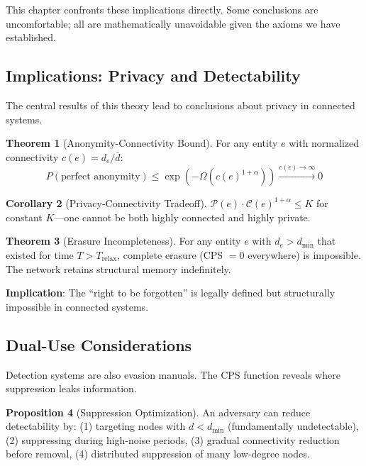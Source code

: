 \documentclass[12pt,a4paper]{article}
\theoremstyle{definition}
\newtheorem{theorem}{Theorem}[section]
\newtheorem{corollary}[theorem]{Corollary}
\newtheorem{proposition}[theorem]{Proposition}
\theoremstyle{remark}
\begin{document}
This chapter confronts these implications directly. Some conclusions are uncomfortable; all are mathematically unavoidable given the axioms we have established.

\subsection{Implications: Privacy and Detectability}

The central results of this theory lead to conclusions about privacy in connected systems.

\begin{theorem}[Anonymity-Connectivity Bound]
\label{thm:anonymity-impossible}
For any entity $e$ with normalized connectivity $c(e) = d_e / \bar{d}$:
\begin{equation}
    \boxed{
    P(\text{perfect anonymity}) \leq \exp\left( -\Omega(c(e)^{1+\alpha}) \right) \xrightarrow{c(e) \to \infty} 0
    }
\end{equation}
\end{theorem}

\begin{corollary}[Privacy-Connectivity Tradeoff]
\label{cor:privacy-tradeoff}
$\mathcal{P}(e) \cdot \mathcal{C}(e)^{1+\alpha} \leq K$ for constant $K$---one cannot be both highly connected and highly private.
\end{corollary}

\begin{theorem}[Erasure Incompleteness]
\label{thm:erasure-incomplete}
For any entity $e$ with $d_e > d_{\min}$ that existed for time $T > T_{\text{relax}}$, complete erasure (CPS $= 0$ everywhere) is impossible. The network retains structural memory indefinitely.
\end{theorem}

\textbf{Implication}: The ``right to be forgotten'' is legally defined but structurally impossible in connected systems.

\subsection{Dual-Use Considerations}

Detection systems are also evasion manuals. The CPS function reveals where suppression leaks information.

\begin{proposition}[Suppression Optimization]
An adversary can reduce detectability by: (1) targeting nodes with $d < d_{\min}$ (fundamentally undetectable), (2) suppressing during high-noise periods, (3) gradual connectivity reduction before removal, (4) distributed suppression of many low-degree nodes.
\end{proposition}
\end{document}
